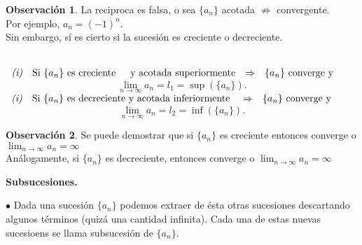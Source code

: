 \documentclass{article}
\theoremstyle{definition}
\theoremstyle{definition}
\newtheorem*{obs}{Observación}
\theoremstyle{remark}
\begin{document}
\begin{obs}
  La reciproca es falsa, o sea $\{a_n\}$ acotada $\not\Rightarrow$ convergente. \\
  Por ejemplo, $a_n=(-1)^n$. \\
  Sin embargo, sí es cierto si la sucesión es creciente o decreciente.
\end{obs}
\begin{teo} \; \\

  $\begin{array}{llcl}
    \emph{(i)} & \text{Si } \{a_n\} \text{ es creciente \;\;\; y acotada superiormente} & \Rightarrow & \{a_n\} \text{ converge y}
    \end{array}$ 
    \[ \lim_{n \to \infty}{a_n}=l_1=\sup\left(\{a_n\}\right).\] 
    $\begin{array}{llcl}
    \emph{(i)} & \text{Si } \{a_n\} \text{ es decreciente y acotada inferiormente } & \Rightarrow & \{a_n\} \text{ converge y}
    \end{array}$ 
    \[ \lim_{n \to \infty}{a_n}=l_2=\inf\left(\{a_n\}\right).\] 
 \end{teo}

\begin{obs}
Se puede demostrar que si $\{a_n\}$ es creciente entonces converge o $\lim_{n \to \infty}{a_n}=\infty$ \\
Análogamente, si $\{a_n\}$ es decreciente, entonces converge o $\lim_{n \to \infty}{a_n}=\infty$
\end{obs}


\begin{center}
\textbf{Subsucesiones.}
\end{center}

$\bullet$ Dada una sucesión $\{a_n\}$ podemos extraer de ésta otras sucesiones descartando algunos términos (quizá una cantidad infinita). Cada una de estas nuevas sucesioens se llama subsucesión de $\{a_n\}$. 
\end{document}

